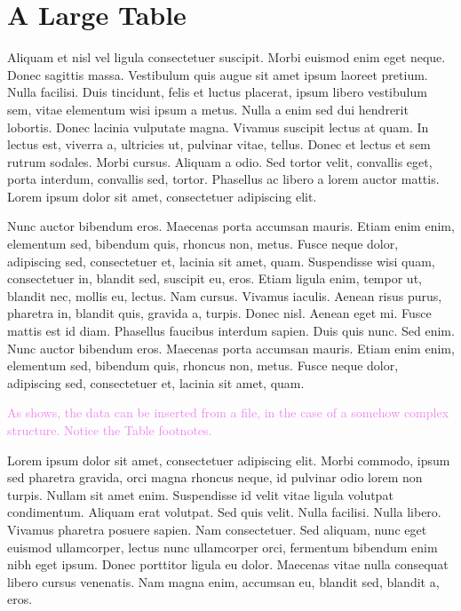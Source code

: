 \chapter{A Large Table}
\label{chapter:appendixB}

Aliquam et nisl vel ligula consectetuer suscipit. Morbi euismod enim eget neque. Donec sagittis massa. Vestibulum quis augue sit amet ipsum laoreet pretium. Nulla facilisi. Duis tincidunt, felis et luctus placerat, ipsum libero vestibulum sem, vitae elementum wisi ipsum a metus. Nulla a enim sed dui hendrerit lobortis. Donec lacinia vulputate magna. Vivamus suscipit lectus at quam. In lectus est, viverra a, ultricies ut, pulvinar vitae, tellus. Donec et lectus et sem rutrum sodales. Morbi cursus. Aliquam a odio. Sed tortor velit, convallis eget, porta interdum, convallis sed, tortor. Phasellus ac libero a lorem auctor mattis. Lorem ipsum dolor sit amet, consectetuer adipiscing elit.

Nunc auctor bibendum eros. Maecenas porta accumsan mauris. Etiam enim enim, elementum sed, bibendum quis, rhoncus non, metus. Fusce neque dolor, adipiscing sed, consectetuer et, lacinia sit amet, quam. Suspendisse wisi quam, consectetuer in, blandit sed, suscipit eu, eros. Etiam ligula enim, tempor ut, blandit nec, mollis eu, lectus. Nam cursus. Vivamus iaculis. Aenean risus purus, pharetra in, blandit quis, gravida a, turpis. Donec nisl. Aenean eget mi. Fusce mattis est id diam. Phasellus faucibus interdum sapien. Duis quis nunc. Sed enim.
Nunc auctor bibendum eros. Maecenas porta accumsan mauris. Etiam enim enim, elementum sed, bibendum quis, rhoncus non, metus. Fusce neque dolor, adipiscing sed, consectetuer et, lacinia sit amet, quam.



\textcolor{violet}{As  shows, the data can be inserted from a file, in the case of a somehow complex structure. Notice the Table footnotes.}	

Lorem ipsum dolor sit amet, consectetuer adipiscing elit. Morbi commodo, ipsum sed pharetra gravida, orci magna rhoncus neque, id pulvinar odio lorem non turpis. Nullam sit amet enim. Suspendisse id velit vitae ligula volutpat condimentum. Aliquam erat volutpat. Sed quis velit. Nulla facilisi. Nulla libero. Vivamus pharetra posuere sapien. Nam consectetuer. Sed aliquam, nunc eget euismod ullamcorper, lectus nunc ullamcorper orci, fermentum bibendum enim nibh eget ipsum. Donec porttitor ligula eu dolor. Maecenas vitae nulla consequat libero cursus venenatis. Nam magna enim, accumsan eu, blandit sed, blandit a, eros. 

